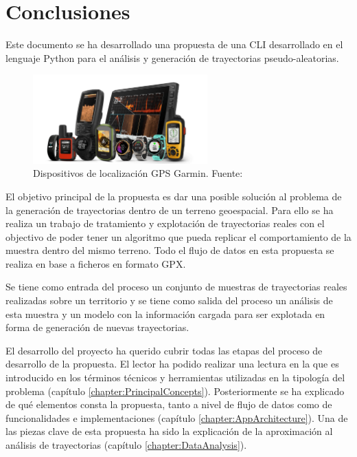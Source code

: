 \chapter{Conclusiones} \label{chapter:Conclusion}
Este documento se ha desarrollado una propuesta de una \ac{CLI} desarrollado en el 
lenguaje Python para el análisis y  generación de trayectorias pseudo-aleatorias.

\begin{figure}[!htb]
\begin{center}
\includegraphics[width=0.6\textwidth]{./Imagenes/garminProducts.png}
\caption{Dispositivos de localización \ac{GPS} Garmin. Fuente: \cite{Garmin01}}
\label{figure:PointGeneration01}
\end{center}
\end{figure}

El objetivo principal de la propuesta es dar una posible solución al problema de la 
generación de trayectorias dentro de un terreno geoespacial. Para ello se ha realiza un 
trabajo de tratamiento y explotación de trayectorias reales con el objectivo de poder 
tener un algoritmo que pueda replicar el comportamiento de la muestra dentro del 
mismo terreno. Todo el flujo de datos en esta propuesta se realiza en base a ficheros en 
formato \ac{GPX}.

Se tiene como entrada del proceso un conjunto de muestras de trayectorias reales 
realizadas sobre un territorio y se tiene como salida del proceso un análisis de esta 
muestra y un modelo con la información cargada para ser explotada en forma de 
generación de nuevas trayectorias.

El desarrollo del proyecto ha querido cubrir todas las etapas del proceso de desarrollo 
de la propuesta. El lector ha podido realizar una lectura en la que es introducido en los 
términos técnicos y herramientas utilizadas en la tipología del problema (capítulo 
\ref{chapter:PrincipalConcepts}). Posteriormente se ha explicado de qué elementos 
consta la propuesta, tanto a nivel de flujo de datos como de funcionalidades e 
implementaciones (capítulo \ref{chapter:AppArchitecture}). Una de las piezas clave de 
esta propuesta ha sido la explicación de la aproximación al análisis de trayectorias 
(capítulo \ref{chapter:DataAnalysis}).

